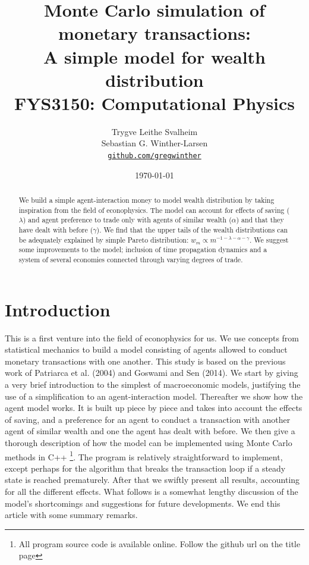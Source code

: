 \documentclass[10pt, a4paper]{amsart}
\title[Simulation of monetary transactions]{Monte Carlo simulation of monetary transactions: \\
\normalsize{A simple model for wealth distribution} \\
  \hrulefill\small{ FYS3150: Computational Physics }\hrulefill}
\author[Svalheim \& Winther-Larsen]{Trygve Leithe Svalheim \\
   Sebastian G. Winther-Larsen \\
  \href{https://github.com/gregwinther/FYS3150/}{\texttt{github.com/gregwinther}}}
\date{\today}
\begin{document}
\begin{titlepage}
\begin{abstract}
We build a simple agent-interaction money to model wealth distribution by taking inspiration from the field of econophysics. The model can account for effects of saving ($\lambda$) and agent preference to trade only with agents of similar wealth ($\alpha$) and that they have dealt with before ($\gamma$). We find that the upper tails of the wealth distributions can be adequately explained by simple Pareto distribution: $w_m \propto m^{-1-\lambda-\alpha-\gamma}$. We suggest some improvements to the model; inclusion of time propagation dynamics and a system of several economies connected through varying degrees of trade.
\end{abstract}
\maketitle
\tableofcontents
\end{titlepage}

\section{Introduction}
This is a first venture into the field of econophysics for us. We use concepts from statistical mechanics to build a model consisting of agents allowed to conduct monetary transactions with one another. This study is based on the previous work of Patriarca et al. (2004)\cite{Patriarca} and Goswami and Sen (2014)\cite{GoswamiSen}. We start by giving a very brief introduction to the simplest of macroeconomic models, justifying the use of a simplification to an agent-interaction model. Thereafter we show how the agent model works. It is built up piece by piece and takes into account the effects of saving, and a preference for an agent to conduct a transaction with another agent of similar wealth and one the agent has dealt with before. We then give a thorough description of how the model can be implemented using Monte Carlo methods in C++ \footnote{All program source code is available online. Follow the github url on the title page}. The program is relatively straightforward to implement, except perhaps for the algorithm that breaks the transaction loop if a steady state is reached prematurely. After that we swiftly present all results, accounting for all the different effects. What follows is a somewhat lengthy discussion of the model's shortcomings and suggestions for future developments. We end this article with some summary remarks.
\end{document}
